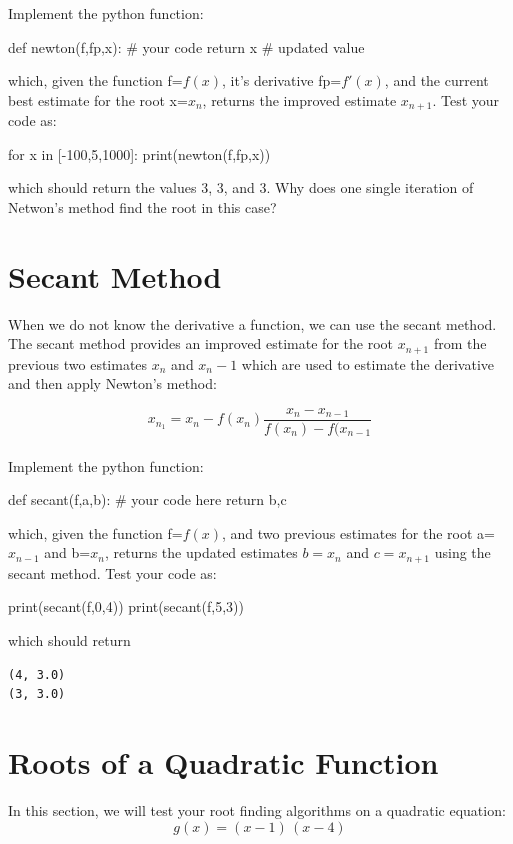\plot Implement the python function:
\begin{python}
def newton(f,fp,x):
    # your code
    return x # updated value
\end{python}
which, given the function f=$f(x)$, it's derivative fp=$f'(x)$, and the current best estimate for the root x=$x_n$, 
returns the improved estimate $x_{n+1}$.  Test your code as:
\begin{python}
for x in [-100,5,1000]:
   print(newton(f,fp,x))
\end{python}
which should return the values $3$, $3$, and $3$.  Why does one single iteration of Netwon's method find the root in this case?

\section{Secant Method}

When we do not know the derivative a function, we can use the secant
method.  The secant method provides an improved estimate for the root
$x_{n+1}$ from the previous two estimates $x_n$ and $x_n-1$ which are used to 
estimate the derivative and then apply Newton's method:

\begin{displaymath}
x_{n_1} = x_n - f(x_n) \frac{x_n-x_{n-1}}{f(x_n) - f(x_{n-1}}
\end{displaymath}\\

\plot Implement the python function:
\begin{python}
def secant(f,a,b):
   # your code here  
   return b,c  
\end{python}
which, given the function f=$f(x)$, and two previous estimates for the root a=$x_{n-1}$ and b=$x_n$, returns the updated estimates $b=x_n$ and $c=x_{n+1}$ using the secant method.  Test your code as:
\begin{python}
print(secant(f,0,4))
print(secant(f,5,3))
\end{python}
which should return
\begin{verbatim}
(4, 3.0)
(3, 3.0)
\end{verbatim}

\section{Roots of a Quadratic Function}

In this section, we will test your root finding algorithms on a quadratic equation:
\begin{equation}
  g(x) = (x-1) \, (x-4)
\end{equation}

